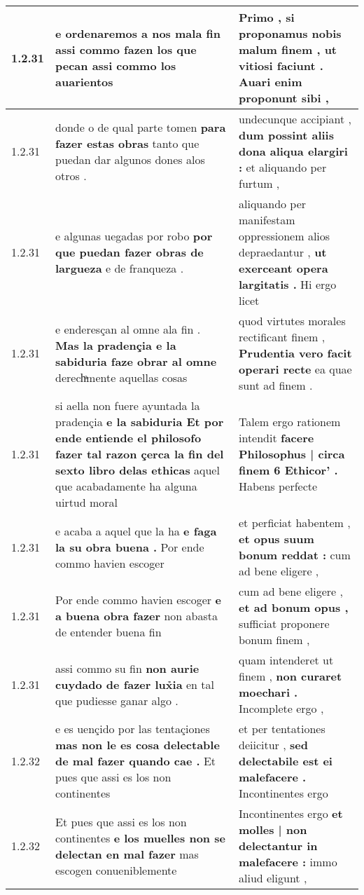 \begin{tabular}{|p{1cm}|p{6.5cm}|p{6.5cm}|}
1.2.31 & e ordenaremos a nos mala fin \textbf{ assi commo fazen los que pecan } assi commo los auarientos & Primo , si proponamus nobis malum finem , \textbf{ ut vitiosi faciunt . } Auari enim proponunt sibi , \\\hline
1.2.31 & donde o de qual parte tomen \textbf{ para fazer estas obras } tanto que puedan dar algunos dones alos otros . & undecunque accipiant , \textbf{ dum possint aliis dona aliqua elargiri : } et aliquando per furtum , \\\hline
1.2.31 & e algunas uegadas por robo \textbf{ por que puedan fazer obras de largueza } e de franqueza . & aliquando per manifestam oppressionem alios depraedantur , \textbf{ ut exerceant opera largitatis . } Hi ergo licet \\\hline
1.2.31 & e enderesçan al omne ala fin . \textbf{ Mas la pradençia e la sabiduria faze obrar al omne } derechͣmente aquellas cosas & quod virtutes morales rectificant finem , \textbf{ Prudentia vero facit operari recte } ea quae sunt ad finem . \\\hline
1.2.31 & si aella non fuere ayuntada la pradençia \textbf{ e la sabiduria Et por ende entiende el philosofo fazer tal razon çerca la fin del sexto libro delas ethicas } aquel que acabadamente ha alguna uirtud moral & Talem ergo rationem intendit \textbf{ facere Philosophus | circa finem 6 Ethicor’ . } Habens perfecte \\\hline
1.2.31 & e acaba a aquel que la ha \textbf{ e faga la su obra buena . } Por ende commo havien escoger & et perficiat habentem , \textbf{ et opus suum bonum reddat : } cum ad bene eligere , \\\hline
1.2.31 & Por ende commo havien escoger \textbf{ e a buena obra fazer } non abasta de entender buena fin & cum ad bene eligere , \textbf{ et ad bonum opus , } sufficiat proponere bonum finem , \\\hline
1.2.31 & assi commo su fin \textbf{ non aurie cuydado de fazer lux̉ia } en tal que pudiesse ganar algo . & quam intenderet ut finem , \textbf{ non curaret moechari . } Incomplete ergo , \\\hline
1.2.32 & e es uençido por las tentaçiones \textbf{ mas non le es cosa delectable de mal fazer quando cae . } Et pues que assi es los non continentes & et per tentationes deiicitur , \textbf{ sed delectabile est ei malefacere . } Incontinentes ergo \\\hline
1.2.32 & Et pues que assi es los non continentes \textbf{ e los muelles non se delectan en mal fazer } mas escogen conueniblemente & Incontinentes ergo \textbf{ et molles | non delectantur in malefacere : } immo aliud eligunt , \\\hline

\end{tabular}
